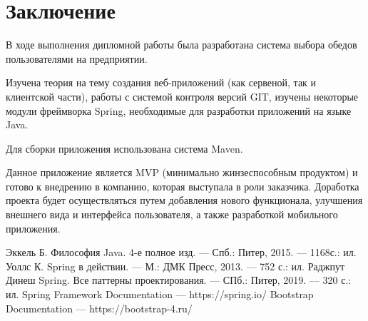 \documentclass[a4paper]{article}
\begin{document}
\newpage
\section{Заключение}

В ходе выполнения дипломной работы была разработана система выбора обедов пользователями на предприятии.

Изучена теория на тему создания веб-приложений (как сервеной, так и клиентской части), работы с системой контроля версий GIT, изучены некоторые модули фреймворка Spring, необходимые для разработки приложений на языке Java.

Для сборки приложения использована система Maven.

Данное приложение является MVP (минимально жинзеспособным продуктом) и готово к внедрению в компанию, которая выступала в роли заказчика. Доработка проекта будет осуществляться путем добавления нового функционала, улучшения внешнего вида и интерфейса пользователя, а также разработкой мобильного приложения.

\newpage
{}
\lstlistoflistings

\newpage
{}
\listoffigures

\newpage
{}
\begin{thebibliography}{5}
Эккель Б. Философия Java. 4-е полное изд. --- Спб.: Питер, 2015. --- 1168с.: ил.
Уоллс К. Spring в действии. --- М.: ДМК Пресс, 2013. --- 752 с.: ил.
Раджпут Динеш Spring. Все паттерны проектирования. --- СПб.: Питер, 2019. --- 320 с.: ил.
Spring Framework Documentation --- https://spring.io/
Bootstrap Documentation --- https://bootstrap-4.ru/
\end{thebibliography}
\end{document}
